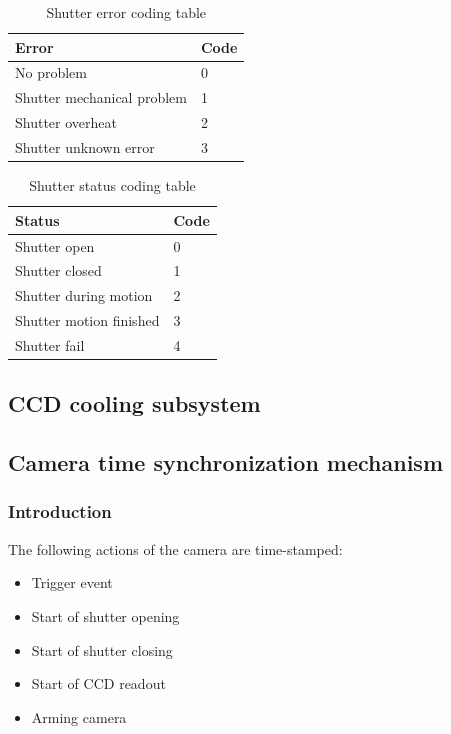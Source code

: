 	\begin{table}[H]
\begin{center}
    \begin{tabular}{ | l || l  |}
    \hline
    \bf{Error} 							& \bf{Code} 	\\ \hline
	No problem							& 0 	\\ \hline    
	Shutter mechanical problem			& 1 	\\ \hline
	Shutter overheat					& 2 	\\ \hline
	Shutter unknown error				& 3 	\\ \hline
    \end{tabular}
    \end{center}
    \caption{Shutter error coding table}
	\label{table:shut_err_table}
\end{table}

	\begin{table}[H]
\begin{center}
    \begin{tabular}{ | l || l  |}
    \hline
    \bf{Status}				& \bf{Code} 	\\ \hline
	Shutter open			& 0 	\\ \hline
	Shutter closed			& 1 	\\ \hline
	Shutter during motion	& 2 	\\ \hline
	Shutter motion finished & 3 	\\ \hline		
	Shutter fail 			& 4 	\\ \hline
    \end{tabular}
    \end{center}
    \caption{Shutter status coding table}
	\label{table:shut_err_table}
\end{table}

\subsection{CCD cooling subsystem}

\subsection{Camera time synchronization mechanism}
\subsubsection{Introduction}

The following actions of the camera are time-stamped:
\begin{itemize}
\item Trigger event
\item Start of shutter opening
\item Start of shutter closing
\item Start of CCD readout
\item Arming camera
\end{itemize}

